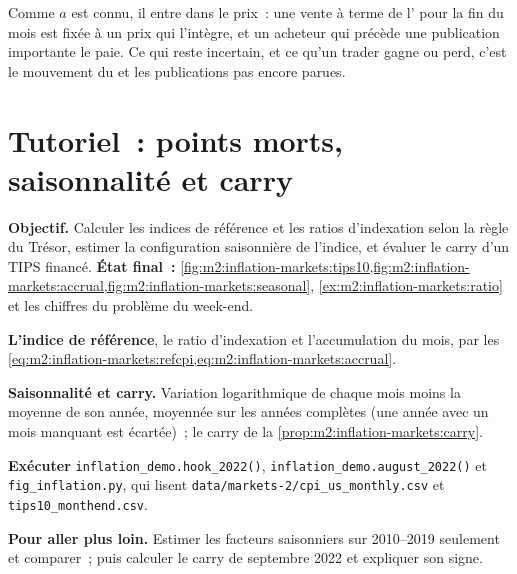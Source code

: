 Comme $a$ est connu, il entre dans le prix~: une vente à terme de l' pour la
fin du mois est fixée à un prix qui l'intègre, et un acheteur qui précède une
publication importante le paie. Ce qui reste incertain, et ce qu'un trader gagne ou
perd, c'est le mouvement du  et les publications pas encore parues.

\section{Tutoriel~: points morts, saisonnalité et carry}\label{tut:m2:inflation-markets:carry}

\begin{tutorial}
\textbf{Objectif.} Calculer les indices de référence et les ratios d'indexation selon la
règle du Trésor, estimer la configuration saisonnière de l'indice, et évaluer le carry d'un
TIPS financé. \textbf{État final~:}
\cref{fig:m2:inflation-markets:tips10,fig:m2:inflation-markets:accrual,fig:m2:inflation-markets:seasonal},
\cref{ex:m2:inflation-markets:ratio} et les chiffres du problème du week-end.
\begin{tutsteps}
\item \textbf{L'indice de référence}, le ratio d'indexation et l'accumulation du mois,
par les \cref{eq:m2:inflation-markets:refcpi,eq:m2:inflation-markets:accrual}.
\label{lst:m2:inflation-markets:ref}
\item \textbf{Saisonnalité et carry.} Variation logarithmique de chaque mois moins la moyenne de son année,
moyennée sur les années complètes (une année avec un mois manquant est écartée)~; le carry de
la \cref{prop:m2:inflation-markets:carry}.
\label{lst:m2:inflation-markets:carry}
\item \textbf{Exécuter} \texttt{inflation\_demo.hook\_2022()},
\texttt{inflation\_demo.august\_2022()} et \texttt{fig\_inflation.py}, qui
lisent \texttt{data/markets-2/cpi\_us\_monthly.csv} et
\texttt{tips10\_monthend.csv}.
\end{tutsteps}
\textbf{Pour aller plus loin.} Estimer les facteurs saisonniers sur 2010--2019 seulement
et comparer~; puis calculer le carry de septembre 2022 et expliquer son signe.
\end{tutorial}

